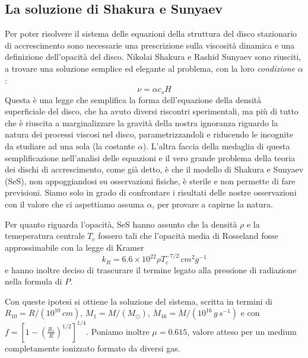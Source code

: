 \documentclass[a4paperbi]{article}
\begin{document}
\subsection{La soluzione di Shakura e Sunyaev}
	Per poter risolvere il sistema delle equazioni della struttura del disco stazionario di accrescimento sono necessarie una prescrizione sulla viscosità dinamica e una definizione dell'opacità del disco. Nikolai Shakura e Rashid Sunyaev sono riusciti, a trovare una soluzione semplice ed elegante al problema, con la loro \textit{condizione} $\alpha$:
	\begin{equation}
		\nu=\alpha c_sH
	\end{equation}
Questa è una legge che semplifica la forma dell'equazione della densità superficiale del disco, che ha avuto diversi riscontri sperimentali, ma più di tutto che è riuscita a marginalizzare la gravità della nostra ignoranza riguardo la natura dei processi viscosi nel disco, parametrizzandoli e riducendo le incognite da studiare ad una sola (la costante $\alpha$). L'altra faccia della medaglia di questa semplificazione nell'analisi delle equazioni e il vero grande problema della teoria dei dischi di accrescimento, come già detto, è che il modello di Shakura e Sunyaev (SeS), non appoggiandosi su osservazioni fisiche, è sterile e non permette di fare previsioni. Siamo solo in grado di confrontare i risultati delle nostre osservazioni con il valore che ci aspettiamo assuma $\alpha$, per provare a capirne la natura.

Per quanto riguarda l'opacità, SeS hanno assunto che la densità $\rho$ e la temeperatura centrale $T_c$ fossero tali che l'opacità media di Rosseland fosse approssimabile con la legge di Kramer
\begin{equation}
	k_R=6.6\times10^{22}\rho T_c^{-7/2}\,cm^2g^{-1}
\end{equation}
e hanno inoltre deciso di trascurare il termine legato alla pressione di radiazione nella formula di $P$.

Con queste ipotesi si ottiene la soluzione del sistema, scritta in termini di $R_{10}=R/(10^{10}\,cm)$, $M_{1}=M/(M_\odot)$, $\dot{M}_{16}=\dot{M}/(10^{16}\,g\,s^{-1})$ e con $f=\left[1-\left(\frac{R_*}{R}\right)^{1/2}\right]^{1/4}$. Poniamo inoltre $\mu=0.615$, valore atteso per un medium completamente ionizzato formato da diversi gas. 
\end{document}
